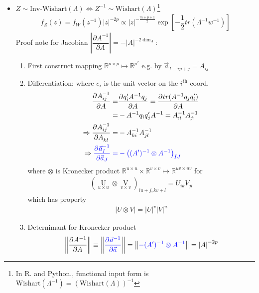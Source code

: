 \begin{itemize}[topsep=2pt,itemsep=0pt]
\begin{itemize}[topsep=2pt,itemsep=0pt]
        \item $ Z\sim \mathrm{Inv}  $-$ \mathrm{Wishart}(\Lambda )\Leftrightarrow Z^{-1}\sim \mathrm{Wishart}(\Lambda )   $\footnote{In R. and Python., functional input form is $ \mathrm{Wishart}(\Lambda^{-1} )=\left(\mathrm{Wishart}(\Lambda ) \right)^{-1}  $}
        \begin{align*}
            f_Z(z)= f_W(z^{-1})\left|z\right|^{-2p} \propto |z|^{-\frac{m+p+1}{2}}\exp\left[ -\dfrac{1}{2}tr(\Lambda ^{-1}w^{-1}) \right]
        \end{align*}
        Proof note for Jacobian $ \left|\dfrac{\partial^{}A^{-1}}{\partial A^{}}\right|=-|A|^{-2\dim_A} $:
        \begin{enumerate}[topsep=2pt,itemsep=0pt]
            \item First construct mapping $ \mathbb{R}^{p\times p}\mapsto \mathbb{R}^{p^2} $ e.g. by $ \vec{a}_{I\equiv ip+j}=A_{ij} $
            \item Differentiation: where $ e_i $ is the unit vector on the $ i^\mathrm{th}  $ coord.
            \begin{align*}
                \dfrac{\partial^{} A^{-1}_{ij}}{\partial A ^{}} =& \dfrac{\partial^{} q_i'A^{-1}q_j}{\partial A^{}}= \dfrac{\partial^{} tr(A^{-1}q_jq_i')}{\partial A^{}}\\
                =&-A^{-1}q_iq_j'A^{-1}=A^{-1}_{:i}A^{-1}_{j:}\\
                \Rightarrow \dfrac{\partial^{} A^{-1}_{ij}}{\partial A_{kl} ^{}}=&-A^{-1}_{ki}A^{-1}_{jl}\\
                \Rightarrow \color{blue}\dfrac{\partial^{} \vec{a}^{-1}_I}{\partial\vec{a}_J}=&\color{blue}-\left( (A')^{-1}\otimes A^{-1} \right)_{IJ}
            \end{align*}
            where $ \otimes $ is Kronecker product $ \mathbb{R}^{u\times u}\times \mathbb{R}^{v\times v}\mapsto \mathbb{R}^{uv\times uv} $ for 
            \begin{align*}
                (\mathop{U}\limits_{u\times u} \otimes \mathop{V}\limits_{v\times v} )_{iu+j,kv+l}=U_{ik}V_{jl} 
            \end{align*}
            which has property
            \begin{align*}
                 \left|U\otimes V\right|=\left|U\right|^{v}\left|V \right|^{u}
            \end{align*}
            \item Deternimant for Kronecker product
            \begin{align*}
                \left\Vert\dfrac{\partial^{} A^{-1}}{\partial A^{}}\right\Vert\equiv \left\Vert{\color{blue} \dfrac{\partial^{} \vec{a}^{-1}}{\partial \vec{a}}}\right\Vert = \left\Vert {\color{blue}-(A')^{-1}\otimes A^{-1} }\right\Vert=\left|A\right|^{-2p}
            \end{align*}
        \end{enumerate}
            
    \end{itemize}
        
    
\end{itemize}

